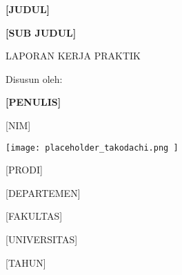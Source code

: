 \documentclass[12pt, a4paper, onecolumn, oneside]{report}
\begin{document}
\begin{titlepage}
    \centering
    \vspace*{2cm}
    {\LARGE\bfseries [JUDUL] \par}
    \vspace{2cm}
    {\LARGE\bfseries [SUB JUDUL] \par}
    \vspace{2cm}
    {\Large LAPORAN KERJA PRAKTIK \par}
    \vspace{2cm}
    {\large Disusun oleh:\par}
    {\large\bfseries [PENULIS]\par}
    {\large [NIM]\par}
    \vfill
    \texttt{[image:  placeholder\_takodachi.png ]} %
    \vfill
    {\large [PRODI]\par}
    {\large [DEPARTEMEN]\par}
    {\large [FAKULTAS]\par}
    {\large [UNIVERSITAS]\par}
    {\large [TAHUN]\par}
\end{titlepage}
\tableofcontents
\newpage

\listoftables
\newpage

\listoffigures
\newpage


\clearpage
{}
\end{document}
